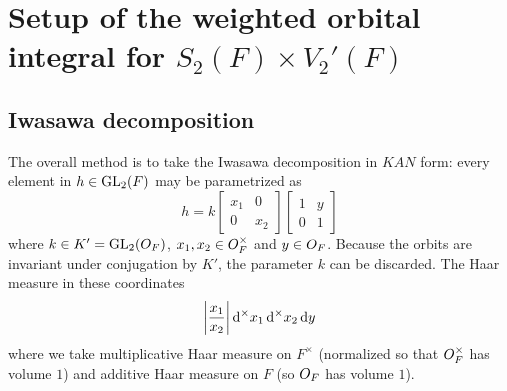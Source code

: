 \chapter{Setup of the weighted orbital integral for $S_2(F) \times V_2'(F)$}
\label{ch:orbitalFJ1}

\section{Iwasawa decomposition}
The overall method is to take the Iwasawa decomposition in $KAN$ form:
every element in $h \in \operatorname{GL}_2(F)$ may be parametrized as
\[ h = k \begin{bmatrix} x_1 & 0 \\ 0 & x_2 \end{bmatrix}
  \begin{bmatrix} 1 & y \\ 0 & 1 \end{bmatrix} \]
where $k \in K' = \operatorname{GL}_2(O_F)$, $x_1, x_2 \in O_F^\times$ and $y \in O_F$.
Because the orbits are invariant under conjugation by $K'$,
the parameter $k$ can be discarded.
The Haar measure in these coordinates
\[ \left\lvert \frac{x_1}{x_2} \right\rvert \odif[\times] x_1 \odif[\times] x_2 \odif y \]
where we take multiplicative Haar measure on $F^\times$
(normalized so that $O_F^\times$ has volume $1$)
and additive Haar measure on $F$ (so $O_F$ has volume $1$).

